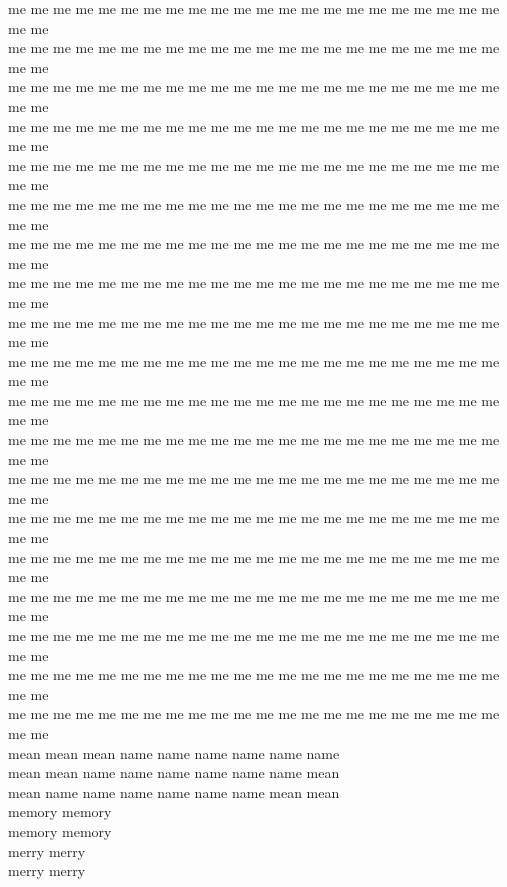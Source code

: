 me me me me me me me me me me me me me me me me me me me me me me me me\\
me me me me me me me me me me me me me me me me me me me me me me me me\\
me me me me me me me me me me me me me me me me me me me me me me me me\\
me me me me me me me me me me me me me me me me me me me me me me me me\\
me me me me me me me me me me me me me me me me me me me me me me me me\\
me me me me me me me me me me me me me me me me me me me me me me me me\\
me me me me me me me me me me me me me me me me me me me me me me me me\\
me me me me me me me me me me me me me me me me me me me me me me me me\\
me me me me me me me me me me me me me me me me me me me me me me me me\\
me me me me me me me me me me me me me me me me me me me me me me me me\\
me me me me me me me me me me me me me me me me me me me me me me me me\\
me me me me me me me me me me me me me me me me me me me me me me me me\\
me me me me me me me me me me me me me me me me me me me me me me me me\\
me me me me me me me me me me me me me me me me me me me me me me me me\\
me me me me me me me me me me me me me me me me me me me me me me me me\\
me me me me me me me me me me me me me me me me me me me me me me me me\\
me me me me me me me me me me me me me me me me me me me me me me me me\\
me me me me me me me me me me me me me me me me me me me me me me me me\\
me me me me me me me me me me me me me me me me me me me me me me me me\\
mean mean mean name name name name name name\\
mean mean name name name name name name mean\\
mean name name name name name name mean mean\\
memory memory\\
memory memory\\
merry merry\\
merry merry\\
